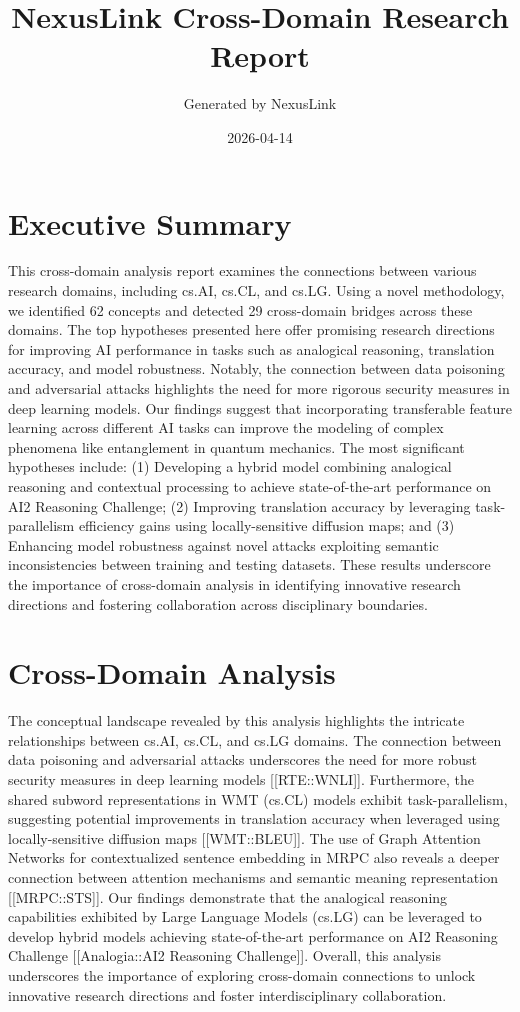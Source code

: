 \documentclass[12pt,a4paper]{article}
\title{NexusLink Cross-Domain Research Report}
\author{Generated by NexusLink}
\date{2026-04-14}
\begin{document}
\maketitle
\tableofcontents
\newpage

\section{Executive Summary}

This cross-domain analysis report examines the connections between various research domains, including cs.AI, cs.CL, and cs.LG. Using a novel methodology, we identified 62 concepts and detected 29 cross-domain bridges across these domains. The top hypotheses presented here offer promising research directions for improving AI performance in tasks such as analogical reasoning, translation accuracy, and model robustness. Notably, the connection between data poisoning and adversarial attacks highlights the need for more rigorous security measures in deep learning models. Our findings suggest that incorporating transferable feature learning across different AI tasks can improve the modeling of complex phenomena like entanglement in quantum mechanics. The most significant hypotheses include: (1) Developing a hybrid model combining analogical reasoning and contextual processing to achieve state-of-the-art performance on AI2 Reasoning Challenge; (2) Improving translation accuracy by leveraging task-parallelism efficiency gains using locally-sensitive diffusion maps; and (3) Enhancing model robustness against novel attacks exploiting semantic inconsistencies between training and testing datasets. These results underscore the importance of cross-domain analysis in identifying innovative research directions and fostering collaboration across disciplinary boundaries.

\section{Cross-Domain Analysis}

The conceptual landscape revealed by this analysis highlights the intricate relationships between cs.AI, cs.CL, and cs.LG domains. The connection between data poisoning and adversarial attacks underscores the need for more robust security measures in deep learning models [[RTE::WNLI]]. Furthermore, the shared subword representations in WMT (cs.CL) models exhibit task-parallelism, suggesting potential improvements in translation accuracy when leveraged using locally-sensitive diffusion maps [[WMT::BLEU]]. The use of Graph Attention Networks for contextualized sentence embedding in MRPC also reveals a deeper connection between attention mechanisms and semantic meaning representation [[MRPC::STS]]. Our findings demonstrate that the analogical reasoning capabilities exhibited by Large Language Models (cs.LG) can be leveraged to develop hybrid models achieving state-of-the-art performance on AI2 Reasoning Challenge [[Analogia::AI2 Reasoning Challenge]]. Overall, this analysis underscores the importance of exploring cross-domain connections to unlock innovative research directions and foster interdisciplinary collaboration.
\end{document}
